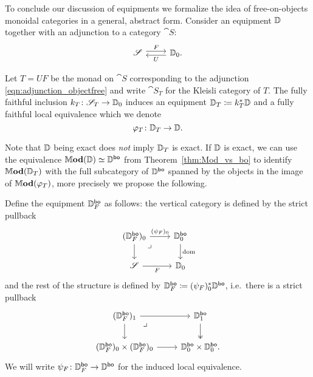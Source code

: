\documentclass[11pt,oneside,article]{memoir}
\begin{document}
To conclude our discussion of equipments we formalize the idea of free-on-objects monoidal categories in a general, abstract form.  Consider an equipment $\mathbb{D}$ together with an adjunction to a category $\cat{S}$:
\begin{equation}
      \label{eqn:adjunction_objectfree}
   \Adjoint{\cat{S}}{\dcat{D}_0.}{F}{U}
\end{equation}
\begin{definition}
   \label{def:kleisli equipment}
   Let $T=UF$ be the monad on $\cat{S}$ corresponding to the adjunction \eqref{eqn:adjunction_objectfree} and write $\cat{S}_T$ for the Kleisli category of $T$.  The fully faithful inclusion $k_T\colon\mathscr{S}_T\to\mathbb{D}_0$ induces an equipment $\mathbb{D}_T\coloneqq k_T^*\mathbb{D}$ and a fully faithful local equivalence which we denote
   \begin{equation}
      \label{eqn:FFLE_DT}
      \varphi_T\colon \mathbb{D}_T\to\mathbb{D}.
   \end{equation}
\end{definition}
Note that $\mathbb{D}$ being exact does \emph{not} imply $\mathbb{D}_T$ is exact.  If $\mathbb{D}$ is exact, we can use the equivalence $\mathbb{M}\mathbf{od}(\mathbb{D})\simeq\mathbb{D}^{\mathsf{bo}}$ from Theorem~\ref{thm:Mod_vs_bo} to identify $\mathbb{M}\mathbf{od}(\mathbb{D}_T)$ with the full subcategory of $\mathbb{D}^{\mathsf{bo}}$ spanned by the objects in the image of $\mathbb{M}\mathbf{od}(\varphi_T)$, more precisely we propose the following.
\begin{definition}
      \label{def:DFbo}
   Define the equipment $\mathbb{D}_F^{\mathsf{bo}}$ as follows: the vertical category is defined by the strict pullback
   \[ \begin{tikzcd}
      (\dcat{D}_F^{\bo})_0 \ar[d] \ar[dr,phantom,"\lrcorner" very near start] \ar[r,"(\psi_F)_0"]
         &\dcat{D}_0^{\bo} \ar[d,"\dom"] \\
     \cat{S} \ar[r,"F"']
         & \dcat{D}_0
   \end{tikzcd} \]
   and the rest of the structure is defined by
   $\mathbb{D}_F^{\mathsf{bo}}\coloneqq(\psi_F)_0^*\mathbb{D}^{\mathsf{bo}}$, i.e.\ there is a strict pullback
   \[ \begin{tikzcd}
      (\dcat{D}_F^{\bo})_1 \ar[r] \ar[dr,phantom,"\lrcorner" very near start] \ar[d]
         & \dcat{D}_1^{\bo} \ar[d,two heads] \\
      (\dcat{D}_F^{\bo})_0\times(\dcat{D}_F^{\bo})_0 \ar[r]
         & \dcat{D}_0^{\bo}\times\dcat{D}_0^{\bo}.
   \end{tikzcd} \]
   We will write $\psi_F\colon\mathbb{D}_F^{\mathsf{bo}}\to\mathbb{D}^{\mathsf{bo}}$ for the induced local equivalence.
\end{definition}
\end{document}
